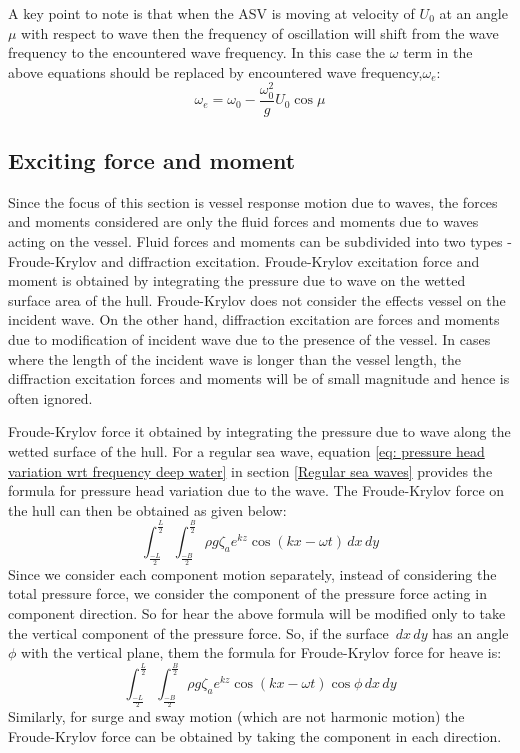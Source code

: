 A key point to note is that when the ASV is moving at velocity of $U_0$ at an
angle $\mu$ with respect to wave then the frequency of oscillation will shift
from the wave frequency to the encountered wave frequency. In this case the
$\omega$ term in the above equations should be replaced by encountered wave
frequency,$\omega_e$:
\begin{equation}
  \omega_e = \omega_0 - \frac{\omega_0^2}{g} U_0 \cos \mu 
  \label{eq: encountered wave frequency }  
\end{equation}

\subsection{Exciting force and moment}
\label{Exciting force and moment}

Since the focus of this section is vessel response motion due to waves, the
forces and moments considered are only the fluid forces and moments due to waves
acting on the vessel. Fluid forces and moments can be subdivided into two types
- Froude-Krylov and diffraction excitation. Froude-Krylov excitation force and
moment is obtained by integrating the pressure due to wave on the wetted surface
area of the hull. Froude-Krylov does not consider the effects vessel on the
incident wave. On the other hand, diffraction excitation are forces and moments
due to modification of incident wave due to the presence of the vessel. In cases
where the length of the incident wave is longer than the vessel length, the
diffraction excitation forces and moments will be of small magnitude and hence
is often ignored. 

Froude-Krylov force it obtained by integrating the pressure due to wave along
the wetted surface of the hull. For a regular sea wave, equation \ref{eq:
pressure head variation wrt frequency deep water} in section \ref{Regular sea
waves} provides the formula for pressure head variation due to the wave. The
Froude-Krylov force on the hull can then be obtained as given below:
\begin{equation}
  \int_{\frac{-L}{2}}^{\frac{L}{2}} 
  \int_{\frac{-B}{2}}^{\frac{B}{2}} 
  \rho g \zeta_a e^{k z} \cos (k x - \omega t) 
  \,dx \,dy 
  \label{eq: Froude-Krylov force}
\end{equation}
Since we consider each component motion separately, instead of considering the
total pressure force, we consider the component of the pressure force acting in
component direction. So for hear the above formula will be modified only to take
the vertical component of the pressure force. So, if the surface $\,dx \,dy$ has
an angle $\phi$ with the vertical plane, them the formula for Froude-Krylov
force for heave is: 
\begin{equation}
  \int_{\frac{-L}{2}}^{\frac{L}{2}} 
  \int_{\frac{-B}{2}}^{\frac{B}{2}} 
  \rho g \zeta_a e^{k z} \cos (k x - \omega t) \cos \phi 
  \,dx \,dy 
  \label{eq: Froude-Krylov force for heave}
\end{equation}  
Similarly, for surge and sway motion (which are not harmonic motion) the
Froude-Krylov force can be obtained by taking the component in each direction.

